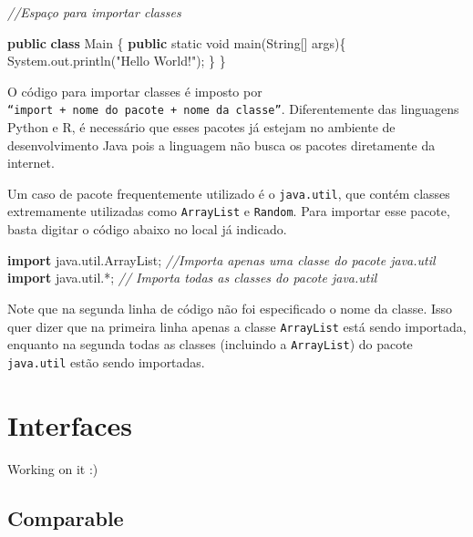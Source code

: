 \documentclass[
]{book}
\newenvironment{Shaded}{\begin{snugshade}}{\end{snugshade}}
\newcommand{\BuiltInTok}[1]{#1}
\newcommand{\CommentTok}[1]{\textcolor[rgb]{0.56,0.35,0.01}{\textit{#1}}}
\newcommand{\DataTypeTok}[1]{\textcolor[rgb]{0.13,0.29,0.53}{#1}}
\newcommand{\FunctionTok}[1]{\textcolor[rgb]{0.00,0.00,0.00}{#1}}
\newcommand{\ImportTok}[1]{#1}
\newcommand{\KeywordTok}[1]{\textcolor[rgb]{0.13,0.29,0.53}{\textbf{#1}}}
\newcommand{\NormalTok}[1]{#1}
\newcommand{\StringTok}[1]{\textcolor[rgb]{0.31,0.60,0.02}{#1}}
\begin{document}
\begin{Shaded}
\begin{Highlighting}[]
\CommentTok{//Espaço para importar classes}

\KeywordTok{public} \KeywordTok{class}\NormalTok{ Main \{}
    \KeywordTok{public} \DataTypeTok{static} \DataTypeTok{void} \FunctionTok{main}\NormalTok{(}\BuiltInTok{String}\NormalTok{[] args)\{}
        \BuiltInTok{System}\NormalTok{.}\FunctionTok{out}\NormalTok{.}\FunctionTok{println}\NormalTok{(}\StringTok{"Hello World!"}\NormalTok{);}
\NormalTok{    \}}
\NormalTok{\}}
\end{Highlighting}
\end{Shaded}

O código para importar classes é imposto por \texttt{“import\ +\ nome\ do\ pacote\ +\ nome\ da\ classe”}. Diferentemente das linguagens Python e R, é necessário que esses pacotes já estejam no ambiente de desenvolvimento Java pois a linguagem não busca os pacotes diretamente da internet.

Um caso de pacote frequentemente utilizado é o \texttt{java.util}, que contém classes extremamente utilizadas como \texttt{ArrayList} e \texttt{Random}. Para importar esse pacote, basta digitar o código abaixo no local já indicado.

\begin{Shaded}
\begin{Highlighting}[]
\KeywordTok{import}\ImportTok{ java.util.ArrayList;} \CommentTok{//Importa apenas uma classe do pacote java.util}
\KeywordTok{import}\ImportTok{ java.util.*;} \CommentTok{// Importa todas as classes do pacote java.util}
\end{Highlighting}
\end{Shaded}

Note que na segunda linha de código não foi especificado o nome da classe. Isso quer dizer que na primeira linha apenas a classe \texttt{ArrayList} está sendo importada, enquanto na segunda todas as classes (incluindo a \texttt{ArrayList}) do pacote \texttt{java.util} estão sendo importadas.

\hypertarget{interfaces}{%
\section{Interfaces}\label{interfaces}}

Working on it :)

\hypertarget{comparable}{%
\subsection{Comparable}\label{comparable}}
\end{document}
